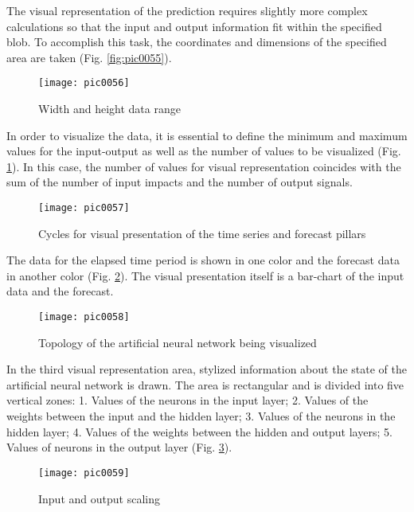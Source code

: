 The visual representation of the prediction requires slightly more complex calculations so that the input and output information fit within the specified blob. To accomplish this task, the coordinates and dimensions of the specified area are taken (Fig. \ref{fig:pic0055}).

\begin{figure}[h]
\centering
\texttt{[image: pic0056]}
\caption{Width and height data range}
\label{fig:pic0056}
\end{figure}
\FloatBarrier

In order to visualize the data, it is essential to define the minimum and maximum values for the input-output as well as the number of values to be visualized (Fig. \ref{fig:pic0056}). In this case, the number of values for visual representation coincides with the sum of the number of input impacts and the number of output signals.

\begin{figure}[h]
\centering
\texttt{[image: pic0057]}
\caption{Cycles for visual presentation of the time series and forecast pillars}
\label{fig:pic0057}
\end{figure}
\FloatBarrier

The data for the elapsed time period is shown in one color and the forecast data in another color (Fig. \ref{fig:pic0057}). The visual presentation itself is a bar-chart of the input data and the forecast.

\begin{figure}[h]
\centering
\texttt{[image: pic0058]}
\caption{Topology of the artificial neural network being visualized}
\label{fig:pic0058}
\end{figure}
\FloatBarrier

In the third visual representation area, stylized information about the state of the artificial neural network is drawn. The area is rectangular and is divided into five vertical zones: 1. Values of the neurons in the input layer; 2. Values of the weights between the input and the hidden layer; 3. Values of the neurons in the hidden layer; 4. Values of the weights between the hidden and output layers; 5. Values of neurons in the output layer (Fig. \ref{fig:pic0058}).

\begin{figure}[h]
\centering
\texttt{[image: pic0059]}
\caption{Input and output scaling}
\label{fig:pic0059}
\end{figure}
\FloatBarrier

